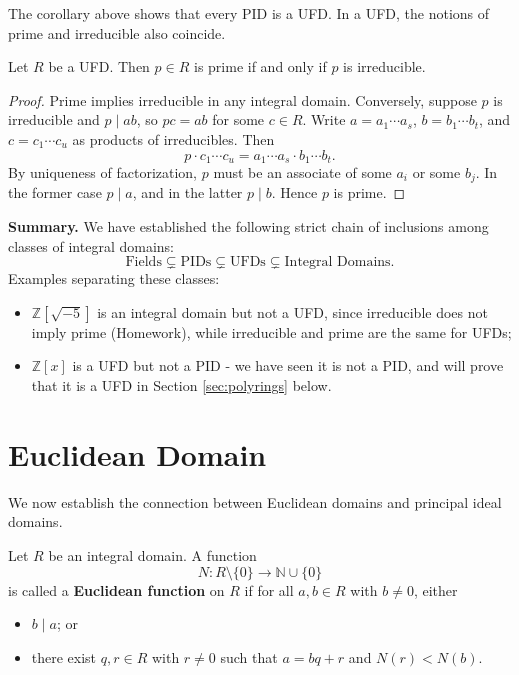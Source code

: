 The corollary above shows that every PID is a UFD. In a UFD, the notions of prime and irreducible also coincide.

\begin{proposition}
Let $R$ be a UFD. Then $p \in R$ is prime if and only if $p$ is irreducible.
\end{proposition}

\begin{proof}
Prime implies irreducible in any integral domain. Conversely, suppose $p$ is irreducible and $p \mid ab$, so $pc = ab$ for some $c \in R$. Write $a = a_1 \cdots a_s$, $b = b_1 \cdots b_t$, and $c = c_1 \cdots c_u$ as products of irreducibles. Then
\[
p \cdot c_1 \cdots c_u = a_1 \cdots a_s \cdot b_1 \cdots b_t.
\]
By uniqueness of factorization, $p$ must be an associate of some $a_i$ or some $b_j$. In the former case $p \mid a$, and in the latter $p \mid b$. Hence $p$ is prime.
\end{proof}

\noindent \textbf{Summary.} We have established the following strict chain of inclusions among classes of integral domains:
\[
\text{Fields} \subsetneq \text{PIDs} \subsetneq \text{UFDs} \subsetneq \text{Integral Domains.}
\]
Examples separating these classes: 
\begin{itemize}
    \item $\mathbb{Z}[\sqrt{-5}]$ is an integral domain but not a UFD, since irreducible does not imply prime (Homework), while irreducible and prime are the same for UFDs;
    \item $\mathbb{Z}[x]$ is a UFD but not a PID - we have seen it is not a PID, and will prove that it is a UFD in Section \ref{sec:polyrings} below.
\end{itemize}


\section{Euclidean Domain}

We now establish the connection between Euclidean domains and principal ideal domains.

\begin{definition}
Let $R$ be an integral domain. A function 
\[
N: R \setminus \{0\} \to \mathbb{N} \cup \{0\}
\]
is called a \textbf{Euclidean function} on $R$ if for all $a, b \in R$ with $b \neq 0$, either 
\begin{itemize}
    \item[(i)] $b \mid a$; or
    \item[(ii)] there exist $q, r \in R$ with $r \neq 0$ such that $a = bq + r$ and $N(r) < N(b)$.
\end{itemize}
\end{definition}

